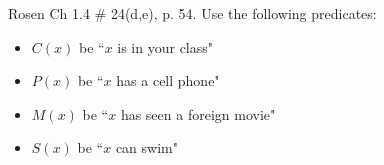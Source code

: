 \documentclass[12pt,addpoints]{exam}
\newcommand{\ra}{\rightarrow}
\begin{document}
\begin{questions}
\question Rosen Ch 1.4 \# 24(d,e), p. 54.
Use the following predicates:
\begin{itemize}
    \item $C(x)$ be ``$x$ is in your class"
    \item $P(x)$ be ``$x$ has a cell phone"
    \item $M(x)$ be ``$x$ has seen a foreign movie"
    \item $S(x)$ be ``$x$ can swim"
\end{itemize}
    \begin{solution}
    \begin{itemize}

\end{itemize}
\end{solution}
\end{questions}
\end{document}
